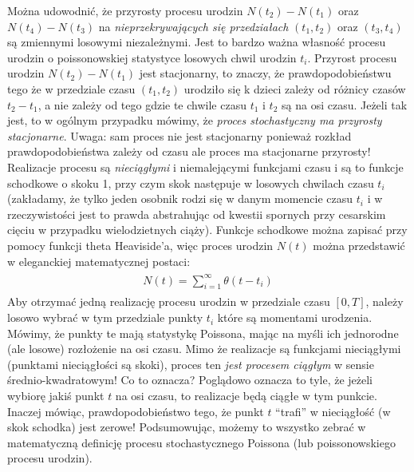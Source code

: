 \documentclass[a4paper,12pt,polish]{sphinxmanual}
\begin{document}
Można udowodnić, że przyrosty procesu urodzin $N(t_2) - N(t_1)$ oraz $N(t_4) - N(t_3)$ na \emph{nieprzekrywających się przedziałach} $(t_1, t_2)$ oraz $(t_3, t_4)$ są zmiennymi losowymi niezależnymi. Jest to bardzo ważna własność procesu urodzin o poissonowskiej statystyce losowych chwil urodzin $t_i$. Przyrost procesu urodzin $N(t_2) - N(t_1)$ jest stacjonarny, to znaczy, że prawdopodobieństwu tego że w przedziale czasu $(t_1, t_2)$ urodziło się k dzieci zależy od różnicy
czasów $t_2-t_1$, a nie zależy od tego gdzie te chwile czasu $t_1$ i $t_2$ są na osi czasu. Jeżeli tak jest, to w ogólnym przypadku mówimy, że \emph{proces stochastyczny ma przyrosty stacjonarne}. Uwaga: sam proces nie jest stacjonarny ponieważ rozkład prawdopodobieństwa zależy od czasu ale proces ma stacjonarne przyrosty!
Realizacje procesu są \emph{nieciągłymi} i niemalejącymi funkcjami czasu i są to funkcje schodkowe o skoku 1, przy czym skok następuje w losowych chwilach czasu $t_i$ (zakładamy, że tylko jeden osobnik rodzi się w danym momencie czasu $t_i$ i w rzeczywistości jest to prawda abstrahując od kwestii spornych przy cesarskim cięciu w przypadku wielodzietnych ciąży). Funkcje schodkowe można zapisać przy pomocy funkcji theta Heaviside'a, więc proces urodzin $N(t)$ można przedstawić w eleganckiej matematycznej postaci:
\label{ch3/chIII021:equation-eqn23}\begin{gather}
\begin{split}N(t) = \sum_{i=1}^{\infty} \theta(t-t_i)\end{split}\label{ch3/chIII021-eqn23}
\end{gather}
Aby otrzymać jedną realizację procesu urodzin w przedziale czasu $[0, T]$, należy losowo wybrać w tym przedziale punkty $t_i$ które są momentami urodzenia. Mówimy, że punkty te mają statystykę Poissona, mając na myśli ich jednorodne (ale losowe) rozłożenie na osi czasu. Mimo że realizacje są funkcjami nieciągłymi (punktami nieciągłości są skoki), proces ten \emph{jest procesem ciągłym} w sensie średnio-kwadratowym! Co to oznacza? Poglądowo oznacza to tyle, że jeżeli wybiorę jakiś punkt $t$ na osi czasu, to realizacje będą ciągłe w tym punkcie. Inaczej mówiąc, prawdopodobieństwo tego, że punkt $t$ ``trafi'' w nieciągłość (w skok schodka) jest zerowe! Podsumowując, możemy to wszystko zebrać w matematyczną definicję procesu stochastycznego Poissona (lub poissonowskiego procesu urodzin).
\end{document}
